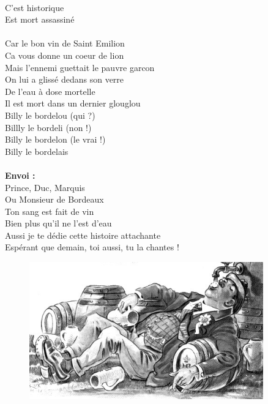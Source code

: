 \\C'est historique
\\Est mort assassiné
\\\\Car le bon vin de Saint Emilion
\\Ca vous donne un coeur de lion
\\Mais l'ennemi guettait le pauvre garcon
\\On lui a glissé dedans son verre
\\De l'eau à dose mortelle
\\Il est mort dans un dernier glouglou
\\Billy le bordelou (qui ?)
\\Billly le bordeli (non !)
\\Billy le bordelon (le vrai !)
\\Billy le bordelais
\\\\\textbf{Envoi : }
\\Prince, Duc, Marquis
\\Ou Monsieur de Bordeaux
\\Ton sang est fait de vin
\\Bien plus qu'il ne l'est d'eau
\\Aussi je te dédie cette histoire attachante
\\Espérant que demain, toi aussi, tu la chantes !

\vspace{1cm}
\begin{figure}[h!]
\centering
   \includegraphics[width=0.9\textwidth]{images/bourguignone.jpg}
 \end{figure}

\breakpage